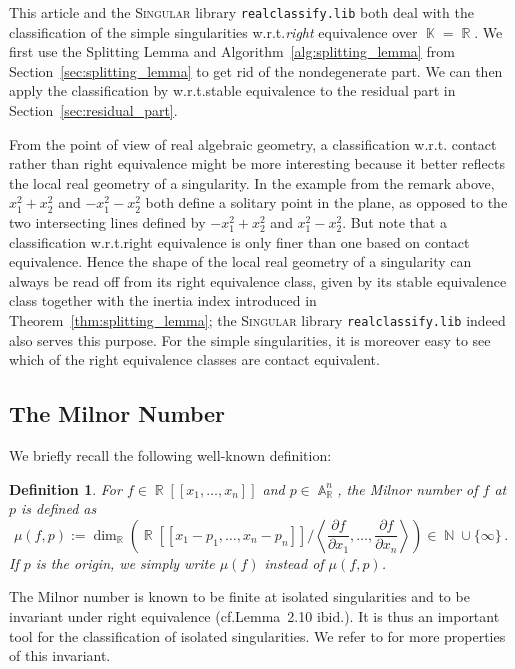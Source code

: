 \documentclass[noend]{amsproc}
\newtheorem{defn}[theorem]{Definition}
\theoremstyle{definition}
\newcommand{\Singular}{\textsc{Singular}}
\newcommand{\realclassify}{\texttt{realclassify.lib}}
\DeclareMathOperator{\N}{\mathbb{N}}
\DeclareMathOperator{\R}{\mathbb{R}}
\DeclareMathOperator{\K}{\mathbb{K}}
\DeclareMathOperator{\A}{\mathbb{A}}
\begin{document}
This article and the \Singular{} library \realclassify{} both deal with the
classification of the simple singularities w.r.t.\@ \emph{right} equivalence
over $\K = \R$. We first use the Splitting Lemma and
Algorithm~\ref{alg:splitting_lemma} from Section~\ref{sec:splitting_lemma} to
get rid of the nondegenerate part. We can then apply the classification by
\citet{AVG1985} w.r.t.\@ stable equivalence to the residual part in
Section~\ref{sec:residual_part}.

From the point of view of real algebraic geometry, a classification w.r.t.\@
contact rather than right equivalence might be more interesting because it
better reflects the local real geometry of a singularity. In the example from
the remark above, $x_1^2+x_2^2$ and $-x_1^2-x_2^2$ both define a solitary point
in the plane, as opposed to the two intersecting lines defined by
$-x_1^2+x_2^2$ and $x_1^2-x_2^2$. But note that a classification w.r.t.\@ right
equivalence is only finer than one based on contact equivalence. Hence the
shape of the local real geometry of a singularity can always be read off from
its right equivalence class, given by its stable equivalence class together
with the inertia index introduced in Theorem~\ref{thm:splitting_lemma}; the
\Singular{} library \realclassify{} indeed also serves this purpose. For the
simple singularities, it is moreover easy to see which of the right equivalence
classes are contact equivalent.


\subsection{The Milnor Number}%
\label{subsec:milnor_number}

We briefly recall the following well-known definition:

\begin{defn}
For $f \in \R[[x_1,\ldots,x_n]]$ and $p \in \A_{\R}^n$, the
\emph{Milnor number} of $f$ at $p$ is defined as
\[
\mu(f, p) := \dim_{\R}
\left( \R[[x_1-p_1, \ldots, x_n-p_n]] \bigg/
\left\langle \frac{\partial f}{\partial x_1}, \ldots,
\frac{\partial f}{\partial x_n} \right\rangle \right)
\in \N \cup \{\infty\} \,.
\]
If $p$ is the origin, we simply write $\mu(f)$ instead of $\mu(f, p)$.
\end{defn}

The Milnor number is known to be finite at isolated singularities
\citep[cf.\@][Chapter~I, Lemma~2.3]{GLS2007} and to be invariant under right
equivalence
(cf.\@ Lemma~2.10 ibid.). It is thus an important tool for the classification
of isolated singularities. We refer to \citet{GLS2007} for more properties of
this invariant.
\end{document}
